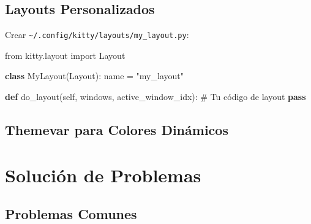 \documentclass[
  doc,
  floatsintext,
  longtable,
  a4paper,
  nolmodern,
  notxfonts,
  notimes,
  12pt,
  colorlinks=true,linkcolor=blue,citecolor=blue,urlcolor=blue]{apa7}
\newenvironment{Shaded}{\begin{snugshade}}{\end{snugshade}}
\newcommand{\CommentTok}[1]{\textcolor[rgb]{0.37,0.37,0.37}{#1}}
\newcommand{\ControlFlowTok}[1]{\textcolor[rgb]{0.00,0.23,0.31}{\textbf{#1}}}
\newcommand{\DataTypeTok}[1]{\textcolor[rgb]{0.68,0.00,0.00}{#1}}
\newcommand{\ErrorTok}[1]{\textcolor[rgb]{0.68,0.00,0.00}{#1}}
\newcommand{\ImportTok}[1]{\textcolor[rgb]{0.00,0.46,0.62}{#1}}
\newcommand{\KeywordTok}[1]{\textcolor[rgb]{0.00,0.23,0.31}{\textbf{#1}}}
\newcommand{\NormalTok}[1]{\textcolor[rgb]{0.00,0.23,0.31}{#1}}
\newcommand{\OperatorTok}[1]{\textcolor[rgb]{0.37,0.37,0.37}{#1}}
\newcommand{\StringTok}[1]{\textcolor[rgb]{0.13,0.47,0.30}{#1}}
\newcommand{\VariableTok}[1]{\textcolor[rgb]{0.07,0.07,0.07}{#1}}
\begin{document}
\subsection{Layouts Personalizados}\label{layouts-personalizados}

Crear \texttt{\textasciitilde{}/.config/kitty/layouts/my\_layout.py}:

\begin{Shaded}
\begin{Highlighting}[]
\ImportTok{from}\NormalTok{ kitty.layout }\ImportTok{import}\NormalTok{ Layout}

\KeywordTok{class}\NormalTok{ MyLayout(Layout):}
\NormalTok{    name }\OperatorTok{=} \StringTok{"my\_layout"}
    
    \KeywordTok{def}\NormalTok{ do\_layout(}\VariableTok{self}\NormalTok{, windows, active\_window\_idx):}
        \CommentTok{\# Tu código de layout}
        \ControlFlowTok{pass}
\end{Highlighting}
\end{Shaded}

\subsection{Themevar para Colores
Dinámicos}\label{themevar-para-colores-dinuxe1micos}

\begin{Shaded}
\end{Shaded}

\section{Solución de Problemas}\label{soluciuxf3n-de-problemas}

\subsection{Problemas Comunes}\label{problemas-comunes}
\end{document}

